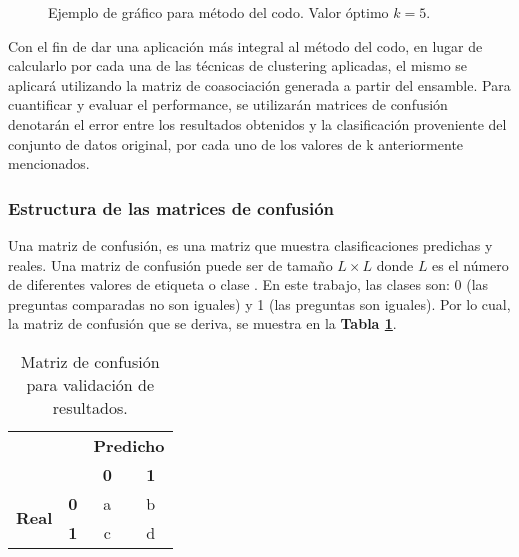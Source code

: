 \begin{figure}
	\centering
	\scriptsize
	\caption{Ejemplo de gráfico para método del codo. Valor óptimo \(k = 5\).}
	\label{fig:codo}
\end{figure}

\bigskip Con el fin de dar una aplicación más integral al método del codo, en lugar de calcularlo por cada una de las técnicas de clustering aplicadas, el mismo se aplicará utilizando la matriz de coasociación generada a partir del ensamble. Para cuantificar y evaluar el performance, se utilizarán matrices de confusión denotarán el error entre los resultados obtenidos y la clasificación proveniente del conjunto de datos original, por cada uno de los valores de k anteriormente mencionados.

\subsubsection{Estructura de las matrices de confusión}
Una matriz de confusión, es una matriz que muestra clasificaciones predichas y reales. Una matriz de confusión puede ser de tamaño \(L \times L\) donde \(L\) es el número de diferentes valores de etiqueta o clase \citep{provost1998glossary}. En este trabajo, las clases son: 0 (las preguntas comparadas no son iguales) y 1 (las preguntas son iguales). Por lo cual, la matriz de confusión que se deriva, se muestra en la \textbf{Tabla \ref{tab:matriz-confusion}}.

\begin{table}[]
	\centering
	\begin{tabular}{ll|c|c|}
		\cline{3-4}
		&                                 & \multicolumn{2}{c|}{\textbf{Predicho}} \\ \cline{3-4}
		&                                 & \textbf{0}         & \textbf{1}        \\ \hline
		\multicolumn{1}{|c|}{\multirow{2}{*}{\textbf{Real}}} & \multicolumn{1}{c|}{\textbf{0}} & a & b \\ \cline{2-4}
		\multicolumn{1}{|c|}{} & \multicolumn{1}{c|}{\textbf{1}} & c                  & d                 \\ \hline
	\end{tabular}
	\caption{Matriz de confusión para validación de resultados.}
	\label{tab:matriz-confusion}
\end{table}

